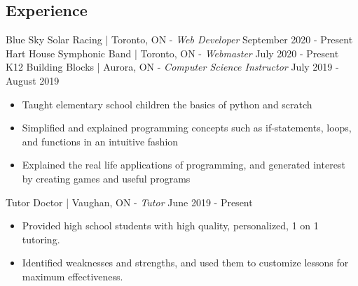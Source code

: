 \documentclass[letter]{res}
\begin{document}
\begin{resume}
    \section{Experience}
    Blue Sky Solar Racing | Toronto, ON \newline - {\sl Web Developer} \hfill September 2020 - Present\\
    Hart House Symphonic Band | Toronto, ON \newline - {\sl Webmaster} \hfill July 2020 - Present\\
    K12 Building Blocks | Aurora, ON \newline - {\sl Computer Science Instructor} \hfill July 2019 - August 2019\\
    \vspace{-2mm}
    \begin{itemize}
        \item Taught elementary school children the basics of python and scratch
        \item Simplified and explained programming concepts such as if-statements, loops, and functions in an intuitive fashion
        \item Explained the real life applications of programming, and generated interest by creating games and useful programs
    \end{itemize}
    Tutor Doctor | Vaughan, ON \newline - {\sl Tutor} \hfill June 2019 - Present\\
    \vspace{-2mm}
    \begin{itemize}
        \item Provided high school students with high quality, personalized, 1 on 1 tutoring.
        \item Identified weaknesses and strengths, and used them to customize lessons for maximum effectiveness.
    \end{itemize}


\end{resume}
\end{document}
